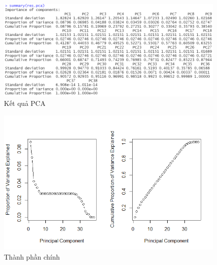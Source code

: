
\begin{figure}[H]
	\centering
	\includegraphics[width=0.9\linewidth]{../Photo Of Result/A2_PCproportion.PNG}
	\caption{Kết quả PCA}
	\label{A2_PCAmod1}
\end{figure}

\begin{figure}[H]
	\centering
	\includegraphics[width=0.9\linewidth]{../Photo Of Result/A2_pca_plotvar.png}
	\caption{Thành phần chính}
	\label{A2_Var}
\end{figure}




